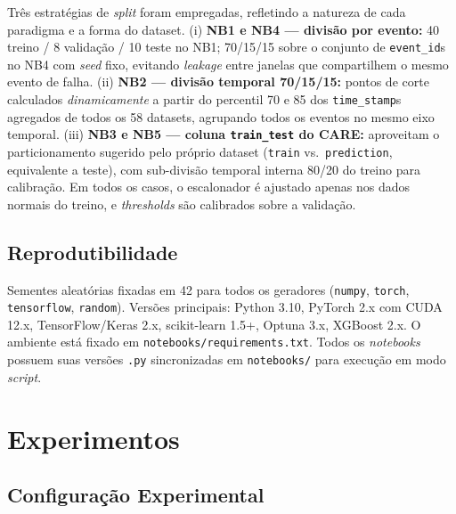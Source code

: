 \documentclass[12pt]{article}
\begin{document}
\begin{sloppypar}
Três estratégias de \textit{split} foram empregadas, refletindo a natureza de cada paradigma e a forma do dataset. (i) \textbf{NB1 e NB4 --- divisão por evento:} 40 treino / 8 validação / 10 teste no NB1; 70/15/15 sobre o conjunto de \texttt{event\_id}s no NB4 com \textit{seed} fixo, evitando \textit{leakage} entre janelas que compartilhem o mesmo evento de falha. (ii) \textbf{NB2 --- divisão temporal 70/15/15:} pontos de corte calculados \emph{dinamicamente} a partir do percentil 70 e 85 dos \texttt{time\_stamp}s agregados de todos os 58 datasets, agrupando todos os eventos no mesmo eixo temporal. (iii) \textbf{NB3 e NB5 --- coluna \texttt{train\_test} do CARE:} aproveitam o particionamento sugerido pelo próprio dataset (\texttt{train} vs.\ \texttt{prediction}, equivalente a teste), com sub-divisão temporal interna 80/20 do treino para calibração. Em todos os casos, o escalonador é ajustado apenas nos dados normais do treino, e \textit{thresholds} são calibrados sobre a validação.
\end{sloppypar}

\subsection{Reprodutibilidade}

\begin{sloppypar}
Sementes aleatórias fixadas em 42 para todos os geradores (\texttt{numpy}, \texttt{torch}, \texttt{tensorflow}, \texttt{random}). Versões principais: Python 3.10, PyTorch 2.x com CUDA 12.x, TensorFlow/Keras 2.x, scikit-learn 1.5+, Optuna 3.x, XGBoost 2.x. O ambiente está fixado em \texttt{notebooks/requirements.txt}. Todos os \textit{notebooks} possuem suas versões \texttt{.py} sincronizadas em \texttt{notebooks/} para execução em modo \textit{script}.
\end{sloppypar}

\section{Experimentos}

\subsection{Configuração Experimental}
\end{document}
